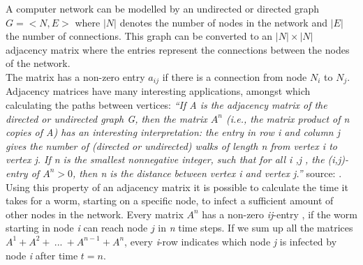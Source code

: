 


A computer network can be modelled by an undirected or directed graph $G = < N, E> $ where $|N|$ denotes the number of nodes in the network and $|E|$ the number of connections. This graph can be converted to an  $|N| \times |N|$ adjacency matrix where the entries represent the connections between the nodes of the network. \\
The matrix has a non-zero entry $a_{ij}$ if there is a connection from node $N_{i}$ to $N_{j}$. \\ 


Adjacency matrices have many interesting applications, amongst which calculating the paths between vertices:
\textit{``If \textit{A} is the adjacency matrix of the directed or undirected graph \textit{G}, then the matrix $A^{n}$ (i.e., the matrix product of \textit{n} copies of \textit{A}) has an interesting interpretation: the entry in row \textit{i} and column \textit{j} gives the number of (directed or undirected) walks of length \textit{n} from vertex \textit{i} to vertex \textit{j}. If \textit{n} is the smallest nonnegative integer, such that for all i ,j , the (i,j)-entry of $A^{n} > 0$, then n is the distance between vertex i and vertex \textit{j}.''}  source: \cite{wikimatrix} .\\
Using this property of an adjacency matrix it is possible to calculate the time it takes for a worm, starting on a specific node, to infect a sufficient amount of other nodes in the network. Every matrix $A^{n}$ has a non-zero \textit{ij}-entry , if the worm starting in node \textit{i} can reach node $j$ in \textit{n} time steps. If we sum up all the matrices $A^{1} + A^{2} + ~...~+ A^{n-1}+A^{n}$, every \textit{i}-row indicates which node \textit{j} is infected by node \textit{i} after time $t=n$.  

